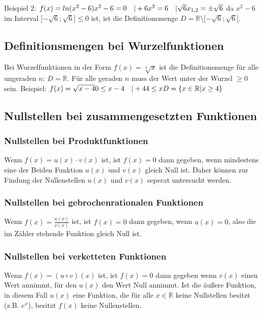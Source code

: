 \documentclass{article}
\begin{document}
    Beispiel 2:\break \break
    $
    f(x) = ln(x^2-6) \break \break
    x^2-6 = 0 \quad |+6 \break
    x^2 = 6 \quad |\sqrt{6} \break
    x_{1,2} = \pm \sqrt{6} \break \break
    $
    da $x^2-6$ im Interval $\lbrack -\sqrt{6};\sqrt{6} \rbrack \leq 0$ ist, ist die Definitionsmenge $D =  \mathbb{R} \setminus \lbrack -\sqrt{6};\sqrt{6} \rbrack $.
    
    \subsection*{Definitionsmengen bei Wurzelfunktionen}
    Bei Wurzelfunktionen in der Form $f(x) = \sqrt[n]{x}$ ist die Definitionsmenge für alle ungeraden $n$: $D = \mathbb{R}$. Für alle geraden $n$ muss der Wert unter der Wurzel $\geq 0$ sein.
    \break \break
    Beispiel: \break\break
    $
    f(x) = \sqrt{x-4} \break
    0 \leq x-4 \quad |+4 \break
    4 \leq x \break \break
    D = \{x \in \mathbb{R}|x \geq 4\}
    $

    \subsection*{Nullstellen bei zusammengesetzten Funktionen}

    \subsubsection*{Nullstellen bei Produktfunktionen}
    Wenn $f(x) = u(x) \cdot v(x)$ ist, ist $f(x) = 0$ dann gegeben, wenn mindestens eine der Beiden Funktion $u(x)$ und $v(x)$ gleich Null ist.
    Daher können zur Findung der Nullenstellen $u(x)$ und $v(x)$ seperat untersucht werden.

    \subsubsection*{Nullstellen bei gebrochenrationalen Funktionen}
    Wenn $f(x) = \frac{u(x)}{v(x)}$ ist, ist $f(x) = 0$ dann gegeben, wenn $u(x) = 0$, also die im Zähler stehende Funktion gleich Null ist.

    \subsubsection*{Nullstellen bei verketteten Funktionen}
    Wenn $f(x) = (u \circ v)(x)$ ist, ist $f(x) = 0$ dann gegeben wenn $v(x)$ einen Wert annimmt, für den $u(x)$ den Wert Null annimmt.
    Ist die äußere Funktion, in diesem Fall $u(x)$ eine Funktion, die für alle $x \in \mathbb{R}$ keine Nullstellen besitzt \break (z.B. $e^x$), besitzt $f(x)$ keine Nullenstellen.

    
\end{document}

